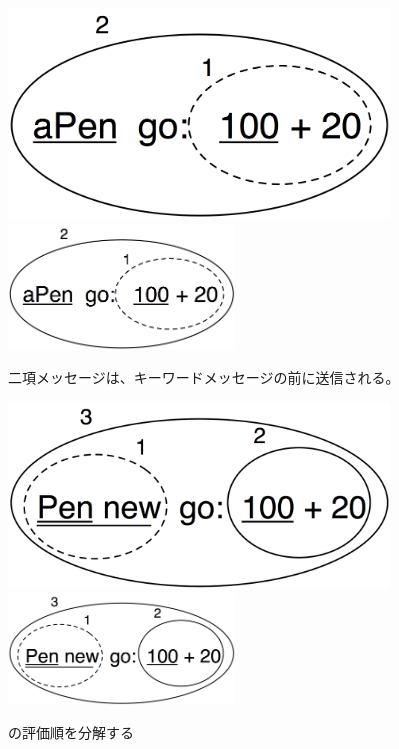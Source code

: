 \documentclass[a4paper,10pt,twoside]{book}
\begin{document}
\begin{figure}[htb]
\begin{minipage}{0.48\textwidth}
	\ifluluelse
		{\centerline{\includegraphics[width=0.9\textwidth]{uKeyBin}}}
		{\centerline{\includegraphics[width=6cm]{uKeyBin}}}
	\caption{二項メッセージは、キーワードメッセージの前に送信される。}
\end{minipage}
\hfill
\begin{minipage}{0.48\textwidth}
	\begin{center}
	\ifluluelse
		{\includegraphics[width=0.9\textwidth]{uunKeyBin}}
		{\includegraphics[width=6cm]{uunKeyBin}}
\caption{の評価順を分解する}
\end{center}
\end{minipage}
\end{figure}
\end{document}
